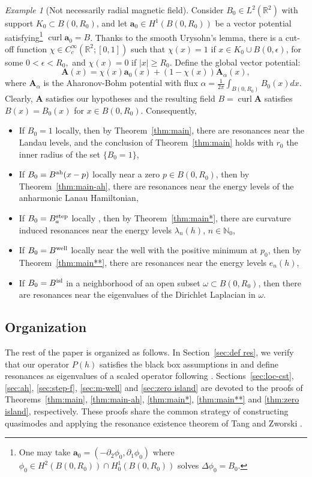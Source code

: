 \documentclass[11pt]{amsart}
\theoremstyle{remark}
\newtheorem{example}[theorem]{Example}
\newcommand{\bA}{\mathbf{A}}
\DeclareMathOperator{\Curl}{curl}
\numberwithin{equation}{section}
\begin{document}
\begin{example}[Not necessarily radial magnetic field]
Consider  $B_0\in L^2(\mathbb R^2)$ with support $K_0\subset B(0,R_0)$, and let $\mathbf a_0\in H^1(B(0,R_0))$ be a vector potential satisfying\footnote{One may take $\mathbf a_0=(-\partial_2\phi_0,\partial_1\phi_0)$ where $\phi_0\in H^2(B(0,R_0))\cap H^1_0(B(0,R_0))$ solves $\Delta\phi_0=B_0$.} $\Curl\mathbf a_0=B$. Thanks to the smooth Urysohn's lemma, there is a cut-off function $\chi\in C_c^\infty(\mathbb R^2;[0,1])$ such that  $\chi(x)=1$ if $x\in K_0\cup B(0,\epsilon)$, for some $0<\epsilon<R_0,$  and $\chi(x)=0$ if $|x|\geq R_0$. Define the global vector potential:
\[\bA(x)=\chi(x)\mathbf a_0(x)+(1-\chi(x))\bA_{\alpha}(x),\]
where $\bA_\alpha$ is the Aharonov-Bohm potential with flux $\alpha=\frac1{2\pi}\int_{B(0,R_0)}B_0(x)dx$. Clearly, $\bA$ satisfies our hypotheses and the resulting field $B=\Curl\bA$ satisfies $B(x)=B_0(x)$ for $x\in B(0,R_0)$. Consequently,
\begin{itemize}
    \item If $B_0=1$ locally, then by Theorem~\ref{thm:main}, there are resonances near the Landau levels, and the conclusion of Theorem~\ref{thm:main} holds with $r_0$ the inner radius of the set $\{B_0=1\}$,
    \item If $B_0=B^{\rm ah}(x-p)$ locally near a zero $p\in B(0,R_0)$, then by Theorem~\ref{thm:main-ah}, there are resonances near the energy levels  of the anharmonic Lanau Hamiltonian,
    \item If $B_0=B_a^{\rm step}$ locally , then by Theorem~\ref{thm:main*}, there are curvature induced resonances near the energy levels $\lambda_n(h)$, $n\in\mathbb N_0$,
    \item If $B_0=B^{\rm well}$ locally  near the well with the positive minimum at $p_0$, then by Theorem~\ref{thm:main**}, there are resonances near the energy levels $e_n(h)$,
    \item If $B_0=B^{\rm isl}$ in a neighborhood of an open subset $\omega\subset B(0,R_0)$, then there are resonances near the eigenvalues of the Dirichlet Laplacian in $\omega$. 
\end{itemize}
\end{example}
%
%
\subsection{Organization}
The rest of the paper is organized as follows. In Section~\ref{sec:def res}, we verify that our operator $P(h)$ satisfies the black box assumptions in \cite{TZ} and define resonances as eigenvalues of a scaled operator following \cite{S}. Sections~\ref{sec:loc-cst}, \ref{sec:ah}, \ref{sec:step-f}, \ref{sec:m-well} and \ref{sec:zero island} are devoted to the proofs of Theorems~\ref{thm:main}, \ref{thm:main-ah}, \ref{thm:main*}, \ref{thm:main**} and \ref{thm:zero island}, respectively. These proofs share the common strategy of  constructing quasimodes and applying the resonance existence theorem of Tang and Zworski \cite{TZ}.
\end{document}
